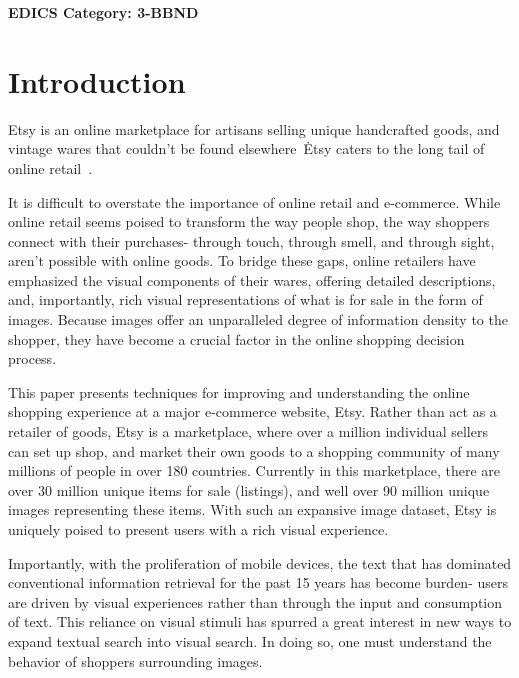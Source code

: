 \documentclass[conference,a4paper]{IEEEtran}
\newcommand{\kamelia}[1]{{\color{blue}{#1}}}
\begin{document}




\ifCLASSOPTIONpeerreview
 \begin{center} \bfseries EDICS Category: 3-BBND \end{center}
 \fi
%
\IEEEpeerreviewmaketitle



\section{Introduction}
\kamelia{What is e-commerce and Etsy?}

Etsy is an online marketplace for artisans selling unique handcrafted goods, and vintage wares that
couldn't be found elsewhere~\. Etsy caters to the long tail of online retail~\cite{Anderson:2006,aryafar2014exploring}. 

It is difficult to overstate the importance of online retail and e-commerce.
While online retail seems poised to transform the way people shop, the way shoppers connect with their purchases- through touch, through smell, and through sight, aren't possible with online goods. To bridge these gaps, online retailers have emphasized the visual components of their wares, offering detailed descriptions, and, importantly, rich visual representations of what is for sale in the form of images. Because images offer an unparalleled degree of information density to the shopper, they have become a crucial factor in the online shopping decision process. 
 
This paper presents techniques for improving and understanding the online shopping experience at a major e-commerce website, Etsy. Rather than act as a retailer of goods, Etsy is a marketplace, where over a million individual sellers can set up shop, and market their own goods to a shopping community of many millions of people in over 180 countries. Currently in this marketplace, there are over 30 million unique items for sale (listings), and well over 90 million unique images representing these items. With such an expansive image dataset, Etsy is uniquely poised to present users with a rich visual experience. 
 
Importantly, with the proliferation of mobile devices, the text that has dominated conventional information retrieval for the past 15 years has become burden- users are driven by visual experiences rather than through the input and consumption of text. This reliance on visual stimuli has spurred a great interest in new ways to expand textual search into visual search. In doing so, one must understand the behavior of shoppers surrounding images.
 
\end{document}
